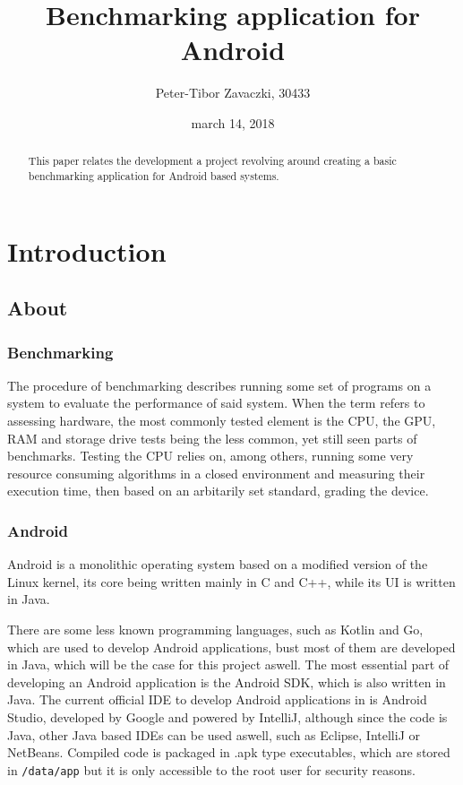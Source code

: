 \documentclass[a4paper,10pt]{report}
\title{
Benchmarking application for Android
}
\author{Peter-Tibor Zavaczki, 30433}
\date{march 14, 2018}
\newcommand{\code}{\texttt}
\begin{document}
\maketitle


\begin{abstract}
 This paper relates the development a project revolving around creating a basic benchmarking application for Android based systems.
\end{abstract}

\chapter{Introduction}
\section{About}
 \subsection{Benchmarking}
 The procedure of benchmarking describes running some set of programs on a system to evaluate the performance of said system. When the term refers to assessing hardware, the most commonly tested element is the CPU, the GPU, RAM and storage drive tests being the less common, yet still seen parts of benchmarks. Testing the CPU relies on, among others, running some very resource consuming algorithms in a closed environment and measuring their execution time, then based on an arbitarily set standard, grading the device.
 \subsection{Android}
 Android is a monolithic operating system based on a modified version of the Linux kernel, its core being written mainly in C and C++, while its UI is written in Java.

 There are some less known programming languages, such as Kotlin and Go, which are used to develop Android applications, bust most of them are developed in Java, which will be the case for this project aswell. The most essential part of developing an Android application is the Android SDK, which is also written in Java. The current official IDE to develop Android applications in is Android Studio, developed by Google and powered by IntelliJ, although since the code is Java, other Java based IDEs can be used aswell, such as Eclipse, IntelliJ or NetBeans. Compiled code is packaged in .apk type executables, which are stored in \code{/data/app} but it is only accessible to the root user for security reasons.
\end{document}
